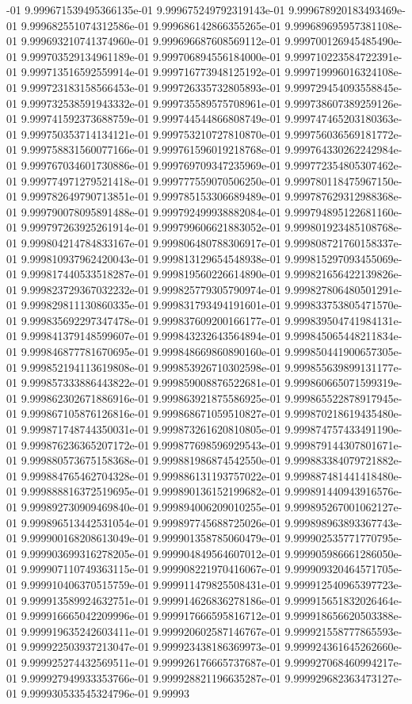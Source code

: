-01	9.999671539495366135e-01	9.999675249792319143e-01	9.999678920183493469e-01	9.999682551074312586e-01	9.999686142866355265e-01	9.999689695957381108e-01	9.999693210741374960e-01	9.999696687608569112e-01	9.999700126945485490e-01	9.999703529134961189e-01	9.999706894556184000e-01	9.999710223584722391e-01	9.999713516592559914e-01	9.999716773948125192e-01	9.999719996016324108e-01	9.999723183158566453e-01	9.999726335732805893e-01	9.999729454093558845e-01	9.999732538591943332e-01	9.999735589575708961e-01	9.999738607389259126e-01	9.999741592373688759e-01	9.999744544866808749e-01	9.999747465203180363e-01	9.999750353714134121e-01	9.999753210727810870e-01	9.999756036569181772e-01	9.999758831560077166e-01	9.999761596019218768e-01	9.999764330262242984e-01	9.999767034601730886e-01	9.999769709347235969e-01	9.999772354805307462e-01	9.999774971279521418e-01	9.999777559070506250e-01	9.999780118475967150e-01	9.999782649790713851e-01	9.999785153306689489e-01	9.999787629312988368e-01	9.999790078095891488e-01	9.999792499938882084e-01	9.999794895122681160e-01	9.999797263925261914e-01	9.999799606621883052e-01	9.999801923485108768e-01	9.999804214784833167e-01	9.999806480788306917e-01	9.999808721760158337e-01	9.999810937962420043e-01	9.999813129654548938e-01	9.999815297093455069e-01	9.999817440533518287e-01	9.999819560226614890e-01	9.999821656422139826e-01	9.999823729367032232e-01	9.999825779305790974e-01	9.999827806480501291e-01	9.999829811130860335e-01	9.999831793494191601e-01	9.999833753805471570e-01	9.999835692297347478e-01	9.999837609200166177e-01	9.999839504741984131e-01	9.999841379148599607e-01	9.999843232643564894e-01	9.999845065448211834e-01	9.999846877781670695e-01	9.999848669860890160e-01	9.999850441900657305e-01	9.999852194113619808e-01	9.999853926710302598e-01	9.999855639899131177e-01	9.999857333886443822e-01	9.999859008876522681e-01	9.999860665071599319e-01	9.999862302671886916e-01	9.999863921875586925e-01	9.999865522878917945e-01	9.999867105876126816e-01	9.999868671059510827e-01	9.999870218619435480e-01	9.999871748744350031e-01	9.999873261620810805e-01	9.999874757433491190e-01	9.999876236365207172e-01	9.999877698596929543e-01	9.999879144307801671e-01	9.999880573675158368e-01	9.999881986874542550e-01	9.999883384079721882e-01	9.999884765462704328e-01	9.999886131193757022e-01	9.999887481441418480e-01	9.999888816372519695e-01	9.999890136152199682e-01	9.999891440943916576e-01	9.999892730909469840e-01	9.999894006209010255e-01	9.999895267001062127e-01	9.999896513442531054e-01	9.999897745688725026e-01	9.999898963893367743e-01	9.999900168208613049e-01	9.999901358785060479e-01	9.999902535771770795e-01	9.999903699316278205e-01	9.999904849564607012e-01	9.999905986661286050e-01	9.999907110749363115e-01	9.999908221970416067e-01	9.999909320464571705e-01	9.999910406370515759e-01	9.999911479825508431e-01	9.999912540965397723e-01	9.999913589924632751e-01	9.999914626836278186e-01	9.999915651832026464e-01	9.999916665042209996e-01	9.999917666595816712e-01	9.999918656620503388e-01	9.999919635242603411e-01	9.999920602587146767e-01	9.999921558777865593e-01	9.999922503937213047e-01	9.999923438186369973e-01	9.999924361645262660e-01	9.999925274432569511e-01	9.999926176665737687e-01	9.999927068460994217e-01	9.999927949933353766e-01	9.999928821196635287e-01	9.999929682363473127e-01	9.999930533545324796e-01	9.99993